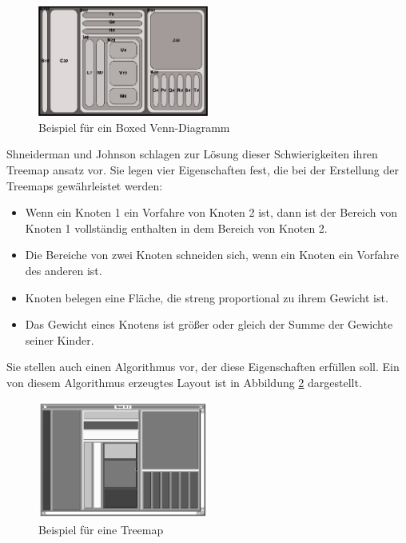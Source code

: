 \begin{figure}[ht]
    \centering
    \includegraphics[width=0.5\textwidth]{images/rectVennDiagram.png}
    \caption{Beispiel für ein Boxed Venn-Diagramm}
    \label{fig:rectVennDiagramm}
\end{figure}

Shneiderman und Johnson schlagen zur Lösung dieser Schwierigkeiten ihren Treemap ansatz vor. Sie legen vier Eigenschaften fest, die bei der Erstellung der Treemaps gewährleistet werden:

\begin{itemize}
    \item Wenn ein Knoten 1 ein Vorfahre von Knoten 2 ist, dann ist der Bereich von Knoten 1 vollständig enthalten in dem Bereich von Knoten 2.
    \item Die Bereiche von zwei Knoten schneiden sich, wenn ein Knoten ein Vorfahre des anderen ist.
    \item Knoten belegen eine Fläche, die streng proportional zu ihrem Gewicht ist.
    \item Das Gewicht eines Knotens ist größer oder gleich der Summe der Gewichte seiner Kinder.
\end{itemize}

Sie stellen auch einen Algorithmus vor, der diese Eigenschaften erfüllen soll. Ein von diesem Algorithmus erzeugtes Layout ist in Abbildung \ref{fig:nestedTreemap} dargestellt. 

\begin{figure}[ht]
    \centering
    \includegraphics[width=0.5\textwidth]{images/nestedTreemapDiagramm.png}
    \caption{Beispiel für eine Treemap}
    \label{fig:nestedTreemap}
\end{figure}

